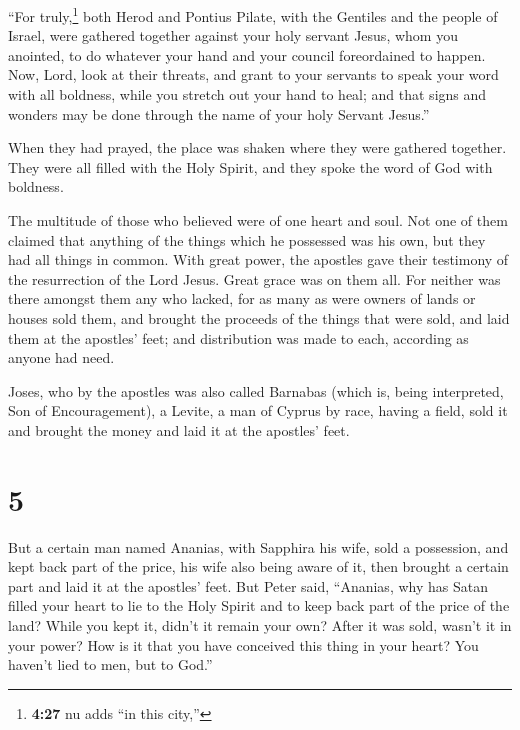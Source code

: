  ``For truly,\footnote{\textbf{4:27} nu adds ``in this
  city,''} both Herod and Pontius Pilate, with the Gentiles and the
people of Israel, were gathered together against your holy servant
Jesus, whom you anointed,  to do whatever your hand and
your council foreordained to happen.  Now, Lord, look at
their threats, and grant to your servants to speak your word with all
boldness,  while you stretch out your hand to heal; and
that signs and wonders may be done through the name of your holy Servant
Jesus.''

 When they had prayed, the place was shaken where they
were gathered together. They were all filled with the Holy Spirit, and
they spoke the word of God with boldness.

 The multitude of those who believed were of one heart
and soul. Not one of them claimed that anything of the things which he
possessed was his own, but they had all things in common.
 With great power, the apostles gave their testimony of
the resurrection of the Lord Jesus. Great grace was on them all.
 For neither was there amongst them any who lacked, for
as many as were owners of lands or houses sold them, and brought the
proceeds of the things that were sold,  and laid them at
the apostles' feet; and distribution was made to each, according as
anyone had need.

 Joses, who by the apostles was also called Barnabas
(which is, being interpreted, Son of Encouragement), a Levite, a man of
Cyprus by race,  having a field, sold it and brought the
money and laid it at the apostles' feet.

\hypertarget{section-4}{%
\section{5}\label{section-4}}

 But a certain man named Ananias, with Sapphira his wife,
sold a possession,  and kept back part of the price, his
wife also being aware of it, then brought a certain part and laid it at
the apostles' feet.  But Peter said, ``Ananias, why has
Satan filled your heart to lie to the Holy Spirit and to keep back part
of the price of the land?  While you kept it, didn't it
remain your own? After it was sold, wasn't it in your power? How is it
that you have conceived this thing in your heart? You haven't lied to
men, but to God.''

